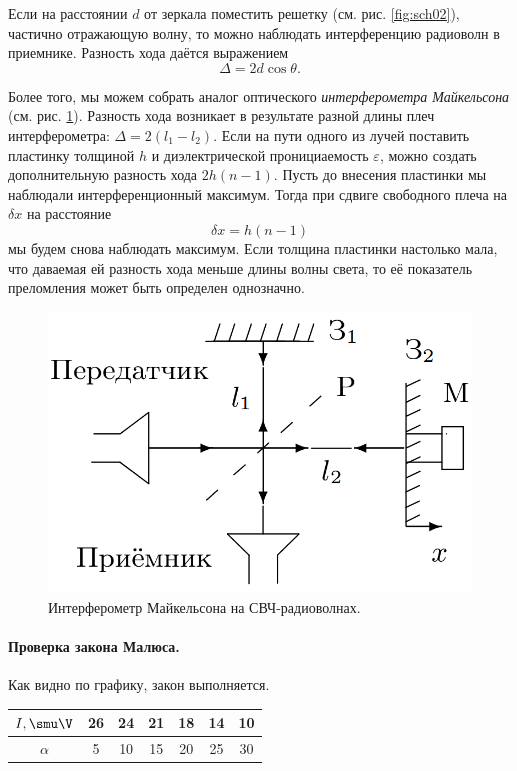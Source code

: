 \documentclass{../lab_class}
\begin{document}
Если на расстоянии $d$ от зеркала поместить решетку (см. рис. \ref{fig:sch02}), частично отражающую волну, то можно наблюдать интерференцию радиоволн в приемнике. Разность хода даётся выражением
\begin{equation}\label{eq:lattice}
	\Delta = 2 d \cos \theta.
\end{equation}

Более того, мы можем собрать аналог оптического \emph{интерферометра Майкельсона} (см. рис. \ref{fig:sch03}). Разность хода возникает в результате разной длины плеч интерферометра: $\Delta = 2 (l_1- l_2)$. Если на пути одного из лучей поставить пластинку толщиной $h$ и диэлектрической пронициаемость $\varepsilon$, можно создать дополнительную разность хода $2 h (n-1)$. Пусть до внесения пластинки мы наблюдали интерференционный максимум. Тогда при сдвиге свободного плеча на $\delta x$ на расстояние
\begin{equation}\label{eq:Michelson}
	\delta x = h(n-1)
\end{equation}
мы будем снова наблюдать максимум. Если толщина пластинки настолько мала, что даваемая ей разность хода меньше длины волны света, то её показатель преломления может быть определен однозначно.

\begin{figure}[H]
	\centering
	\includegraphics[width = 0.3 \textwidth]{sch03.png}
	\caption{Интерферометр Майкельсона на СВЧ-радиоволнах.}
	\label{fig:sch03}
\end{figure}

\paragraph{Проверка закона Малюса.}

Как видно по графику, закон выполняется.

\begin{center}
	\begin{tabular}{|c|c|c|c|c|c|c|}
		\hline
		$I, \smu \V$ & 26 & 24 & 21 & 18 & 14 & 10 \\ \hline
		$\alpha$  & 5 & 10 & 15 & 20 & 25 & 30 \\ \hline
	\end{tabular}
\end{center}
\end{document}
